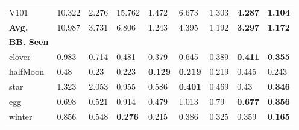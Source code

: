 \begin{table}[h]
\begin{minipage}{0.48\linewidth}
{\begin{tabular}{C{2cm}|C{.8cm}C{.8cm}C{.8cm}C{.8cm}C{.8cm}C{.8cm}C{.8cm}C{.8cm}}
         V101 & 10.322 &  2.276 &  15.762 &  1.472 &  6.673 &  1.303 &  \textbf{4.287} &  \textbf{1.104} \\
        \textbf{Avg.} & 10.987 &  3.731 &  6.806 &  1.243 &  4.395 &  1.192 &  \textbf{3.297} &  \textbf{1.172} \\

        \midrule
        \midrule
    \raggedright \textbf{BB. Seen}  &  &  &  & \\

    clover & 0.983 &  0.714 &  0.481 &  0.379 &  0.645 &  0.389 &  \textbf{0.411} &  \textbf{0.355} \\
    
   halfMoon & 0.48 &  0.23 &  0.223 &  \textbf{0.129} &  \textbf{0.219} &  0.219 &  0.445 &  0.243 \\
   
 star & 1.323 &  2.053 &  0.955 &  0.586 &  \textbf{0.401} &  0.469 &  0.43 &  \textbf{0.346} \\
 
egg& 0.698 &  0.521 &  0.914 &  0.479 &  1.013 &  0.79 &  \textbf{0.677} &  \textbf{0.356} \\

 winter& 0.856 &  0.548 &  \textbf{0.276} &  0.215 &  0.386 &  0.325 &  0.359 &  \textbf{0.165} \\


\end{tabular}}
\end{minipage}
\end{table}

